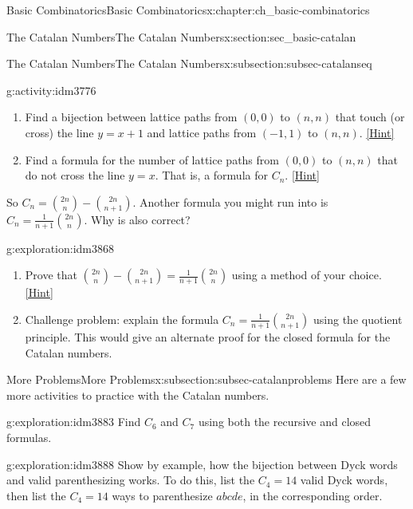 \documentclass[oneside,10pt,]{book}
\numberwithin{equation}{chapter}
\begin{document}
\begin{chapterptx}{Basic Combinatorics}{}{Basic Combinatorics}{}{}{x:chapter:ch_basic-combinatorics}
\begin{sectionptx}{The Catalan Numbers}{}{The Catalan Numbers}{}{}{x:section:sec_basic-catalan}
\begin{subsectionptx}{The Catalan Numbers}{}{The Catalan Numbers}{}{}{x:subsection:subsec-catalanseq}
\begin{activity}{}{g:activity:idm3776}
\begin{enumerate}[font=\bfseries,label=(\alph*),ref=\alph*]
\item{}Find a bijection between lattice paths from \((0,0)\) to \((n,n)\) that touch (or cross) the line \(y=x+1\) and lattice paths from \((-1,1)\) to \((n,n)\).%
\space\hspace*{0pt}\hfill{\tiny\hyperlink{g:hint:idm3814-back}{[Hint]}}\item{}Find a formula for the number of lattice paths from \((0,0)\) to \((n,n)\) that do not cross the line \(y=x\). That is, a formula for \(C_n\).%
\space\hspace*{0pt}\hfill{\tiny\hyperlink{g:hint:idm3859-back}{[Hint]}}\end{enumerate}
\end{activity}
So \(C_n = \binom{2n}{n} - \binom{2n}{n+1}\).  Another formula you might run into is \(C_n = \frac{1}{n+1}\binom{2n}{n}\).  Why is also correct?%
\begin{exploration}{}{g:exploration:idm3868}%
\begin{enumerate}[font=\bfseries,label=(\alph*),ref=\alph*]
\item{}Prove that \(\binom{2n}{n} - \binom{2n}{n+1} = \frac{1}{n+1}\binom{2n}{n}\) using a method of your choice.%
\space\hspace*{0pt}\hfill{\tiny\hyperlink{g:hint:idm3873-back}{[Hint]}}\item{}Challenge problem: explain the formula \(C_n = \frac{1}{n+1}\binom{2n}{n+1}\) using the quotient principle.  This would give an alternate proof for the closed formula for the Catalan numbers.%
\end{enumerate}
\end{exploration}
\end{subsectionptx}
%
%
\typeout{************************************************}
\typeout{************************************************}
%
\begin{subsectionptx}{More Problems}{}{More Problems}{}{}{x:subsection:subsec-catalanproblems}
Here are a few more activities to practice with the Catalan numbers.%
\begin{exploration}{}{g:exploration:idm3883}%
Find \(C_6\) and \(C_7\) using both the recursive and closed formulas.%
\end{exploration}
\begin{exploration}{}{g:exploration:idm3888}%
Show by example, how the bijection between Dyck words and valid parenthesizing works.  To do this, list the \(C_4 = 14\) valid Dyck words, then list the \(C_4 = 14\) ways to parenthesize \(abcde\), in the corresponding order.%

\end{exploration}
\end{subsectionptx}
\end{sectionptx}
\end{chapterptx}
\end{document}
